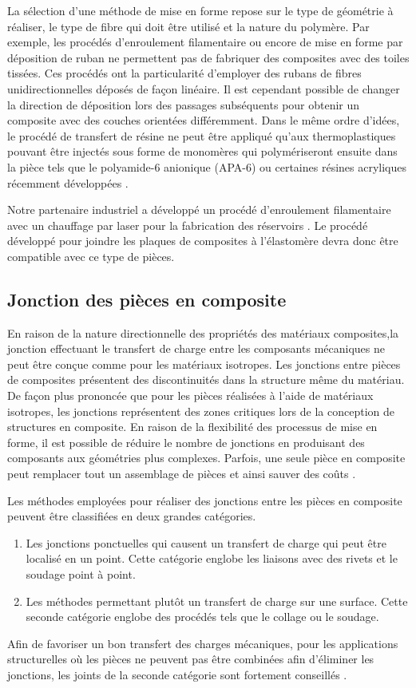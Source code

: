 La sélection d'une méthode de mise en forme repose sur le type de géométrie à réaliser, le type de fibre qui doit être utilisé et la nature du polymère. 
Par exemple, les procédés d'enroulement filamentaire ou encore de mise en forme par déposition de ruban ne permettent pas de fabriquer des composites avec des toiles tissées. 
Ces procédés ont la particularité d'employer des rubans de fibres unidirectionnelles déposés de façon linéaire. 
Il est cependant possible de changer la direction de déposition lors des passages subséquents pour obtenir un composite avec des couches orientées différemment. 
Dans le même ordre d'idées, le procédé de transfert de résine ne peut être appliqué qu'aux thermoplastiques pouvant être injectés sous forme de monomères qui polymériseront ensuite dans la pièce tels que le polyamide-6 anionique (APA-6) \cite{Rijswijk2006} ou certaines résines acryliques récemment développées \cite{Penumadu2019,Murray2019}. 

Notre partenaire industriel a développé un procédé d'enroulement filamentaire avec un chauffage par laser pour la fabrication des réservoirs \cite{Krzeminski2014}. 
Le procédé développé pour joindre les plaques de composites à l'élastomère devra donc être compatible avec ce type de pièces. 

\subsection{Jonction des pièces en composite}

En raison de la nature directionnelle des propriétés des matériaux composites,la jonction effectuant le transfert de charge entre les composants mécaniques ne peut être conçue comme pour les matériaux isotropes. 
Les jonctions entre pièces de composites présentent des discontinuités dans la structure même du matériau. 
De façon plus prononcée que pour les pièces réalisées à l'aide de matériaux isotropes, les jonctions représentent des zones critiques lors de la conception de structures en composite. 
En raison de la flexibilité des processus de mise en forme, il est possible de réduire le nombre de jonctions en produisant des composants aux géométries plus complexes. 
Parfois, une seule pièce en composite peut remplacer tout un assemblage de pièces et ainsi sauver des coûts \cite{KarenMas_CW2004}. 

Les méthodes employées pour réaliser des jonctions entre les pièces en composite peuvent être classifiées en deux grandes catégories. 
\begin{enumerate}
	\item Les jonctions ponctuelles qui causent un transfert de charge qui peut être localisé en un point. 
	Cette catégorie englobe les liaisons avec des rivets et le soudage point à point. 
	\item Les méthodes permettant plutôt un transfert de charge sur une surface. 
	Cette seconde catégorie englobe des procédés tels que le collage ou le soudage. 
\end{enumerate}
Afin de favoriser un bon transfert des charges mécaniques, pour les applications structurelles où les pièces ne peuvent pas être combinées afin d'éliminer les jonctions, les joints de la seconde catégorie sont fortement conseillés \cite{campbell2003}. 

